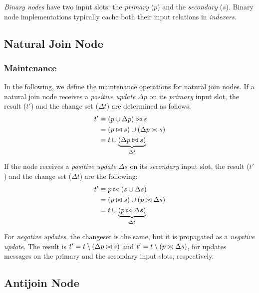 
\emph{Binary nodes} %
have two input slots: the \emph{primary} ($p$) and the \emph{secondary} ($s$). Binary node implementations typically cache both their input relations in \emph{indexers}.

\subsection{Natural Join Node}

\subsubsection{Maintenance}

In the following, we define the maintenance operations for natural join nodes. If a natural join node receives a \emph{positive update} $\Delta p$ on its \emph{primary} input slot, the result ($t'$) and the change set ($ \Delta t$) are determined as follows:
\begin{align*}
	t'       & \equiv \left(p \cup \Delta p\right) \bowtie s           \\
	         & = (p \bowtie s) \cup (\Delta p \bowtie s) \\
	         & = t \cup \underbrace{(\Delta p \bowtie s)}_{\Delta t}
\end{align*}

If the node receives a \emph{positive update} $\Delta s$ on its \emph{secondary} input slot, the result ($t'$) and the change set ($ \Delta t$) are the following:
\begin{align*}
	t'       & \equiv p \bowtie \left(s \cup \Delta s\right)           \\
	         & = (p \bowtie s) \cup (p \bowtie \Delta s) \\
	         & = t \cup \underbrace{(p \bowtie \Delta s)}_{\Delta t}
\end{align*}

For \emph{negative updates}, the changeset is the same, but it is propagated as a \emph{negative update}. The result is $t' = t \setminus (\Delta p \bowtie s)$ and $t' = t \setminus (p \bowtie \Delta s)$, for updates messages on the primary and the secondary input slots, respectively.

\subsection{Antijoin Node}

